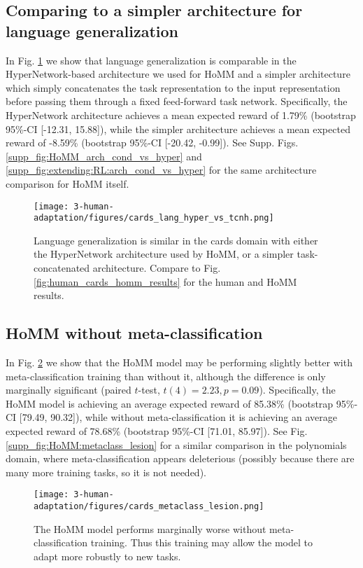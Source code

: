 \subsection{Comparing to a simpler architecture for language generalization}\label{appendix:human:lang_tcnh}
In Fig. \ref{supp_fig:human:lang_tcnh} we show that language generalization is comparable in the HyperNetwork-based architecture we used for HoMM and a simpler architecture which simply concatenates the task representation to the input representation before passing them through a fixed feed-forward task network. Specifically, the HyperNetwork architecture achieves a mean expected reward of 1.79\% (bootstrap 95\%-CI [-12.31, 15.88]), while the simpler architecture achieves a mean expected reward of -8.59\% (bootstrap 95\%-CI [-20.42, -0.99]). See Supp. Figs. \ref{supp_fig:HoMM_arch_cond_vs_hyper} and \ref{supp_fig:extending:RL:arch_cond_vs_hyper} for the same architecture comparison for HoMM itself.  

\begin{figure}[H]
\centering
\texttt{[image: 3-human-adaptation/figures/cards\_lang\_hyper\_vs\_tcnh.png]}
\caption[Language generalization is similar in the cards domain with either the HyperNetwork architecture used by HoMM, or a simpler task-concatenated architecture.]{Language generalization is similar in the cards domain with either the HyperNetwork architecture used by HoMM, or a simpler task-concatenated architecture. Compare to Fig. \ref{fig:human_cards_homm_results} for the human and HoMM results.} \label{supp_fig:human:lang_tcnh}
\end{figure}

\subsection{HoMM without meta-classification}

In Fig. \ref{supp_fig:human:homm_metaclass_lesion} we show that the HoMM model may be performing slightly better with meta-classification training than without it, although the difference is only marginally significant (paired \(t\)-test, \(t(4) = 2.23, p = 0.09\)). Specifically, the HoMM model is achieving an average expected reward of 85.38\% (bootstrap 95\%-CI [79.49, 90.32]), while without meta-classification it is achieving an average expected reward of 78.68\% (bootstrap 95\%-CI [71.01, 85.97]). See Fig. \ref{supp_fig:HoMM:metaclass_lesion} for a similar comparison in the polynomials domain, where meta-classification appears deleterious (possibly because there are many more training tasks, so it is not needed). 

\begin{figure}[H]
\centering
\texttt{[image: 3-human-adaptation/figures/cards\_metaclass\_lesion.png]}
\caption[The HoMM model performs marginally worse without meta-classification training.]{The HoMM model performs marginally worse without meta-classification training. Thus this training may allow the model to adapt more robustly to new tasks.} \label{supp_fig:human:homm_metaclass_lesion}
\end{figure}
